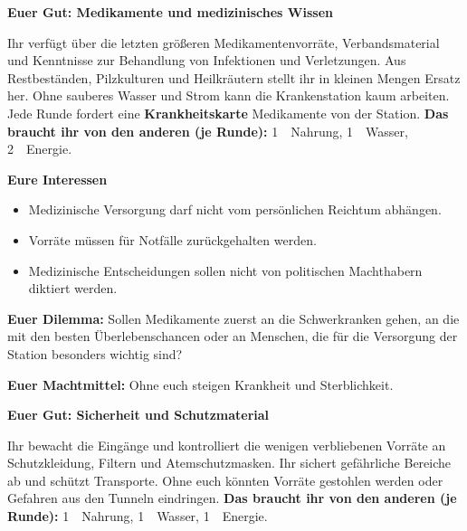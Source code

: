 \clearpage
{}
\noindent\textbf{Euer Gut: Medikamente und medizinisches Wissen} \rM\par\vspace{1mm}
Ihr verfügt über die letzten größeren Medikamentenvorräte, Verbandsmaterial und Kenntnisse zur Behandlung von Infektionen und Verletzungen. Aus Restbeständen, Pilzkulturen und Heilkräutern stellt ihr in kleinen Mengen Ersatz her. Ohne sauberes Wasser und Strom kann die Krankenstation kaum arbeiten. Jede Runde fordert eine \textbf{Krankheitskarte} Medikamente von der Station.
\textbf{Das braucht ihr von den anderen (je Runde):} 1~\rN\ Nahrung, 1~\rW\ Wasser, 2~\rE\ Energie.

\medskip\noindent\textbf{Eure Interessen}
\begin{itemize}
  \item Medizinische Versorgung darf nicht vom persönlichen Reichtum abhängen.
  \item Vorräte müssen für Notfälle zurückgehalten werden.
  \item Medizinische Entscheidungen sollen nicht von politischen Machthabern diktiert werden.
\end{itemize}
\textbf{Euer Dilemma:} Sollen Medikamente zuerst an die Schwerkranken gehen, an die mit den besten Überlebenschancen oder an Menschen, die für die Versorgung der Station besonders wichtig sind?\par
\textbf{Euer Machtmittel:} Ohne euch steigen Krankheit und Sterblichkeit.\par\medskip
{}

\clearpage
{}
\noindent\textbf{Euer Gut: Sicherheit und Schutzmaterial} \rS\par\vspace{1mm}
Ihr bewacht die Eingänge und kontrolliert die wenigen verbliebenen Vorräte an Schutzkleidung, Filtern und Atemschutzmasken. Ihr sichert gefährliche Bereiche ab und schützt Transporte. Ohne euch könnten Vorräte gestohlen werden oder Gefahren aus den Tunneln eindringen.
\textbf{Das braucht ihr von den anderen (je Runde):} 1~\rN\ Nahrung, 1~\rW\ Wasser, 1~\rE\ Energie.

